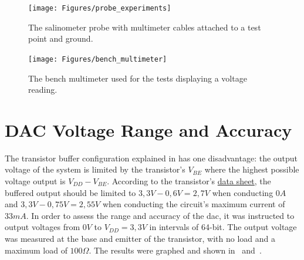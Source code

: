 \begin{figure}[ht]
    \begin{minipage}{0.5\textwidth}
        \centering
        \texttt{[image: Figures/probe\_experiments]}
        \caption{The salinometer probe with multimeter cables attached to a test point and ground.}
        \label{fig:probe-experiments} %
    \end{minipage}
    \begin{minipage}{0.5\textwidth}
        \centering
        \texttt{[image: Figures/bench\_multimeter]}
        \caption{The bench multimeter used for the tests displaying a voltage reading.}
        \label{fig:bench-multimeter} %
    \end{minipage}
\end{figure}

\section{DAC Voltage Range and Accuracy}\label{sec:dac-voltage-range-and-accuracy}

The transistor buffer configuration explained in  has one disadvantage: the output voltage of the system is limited by the transistor's $V_{BE}$ where the highest possible voltage output is $V_{DD} - V_{BE}$.
According to the transistor's \href{https://www.lcsc.com/datasheet/lcsc_datasheet_2310131500_Jiangsu-Changjing-Electronics-Technology-Co---Ltd--S8050-J3Y-RANGE-200-350_C2146.pdf}{data sheet}, the buffered output should be limited to $3,3V - 0,6V = 2,7V$ when conducting $0A$ and $3,3V - 0,75V = 2,55V$ when conducting the circuit's maximum current of $33mA$.
In order to assess the range and accuracy of the \gls{dac}, it was instructed to output voltages from $0V$ to $V_{DD} = 3,3V$ in intervals of 64-bit. 
The output voltage was measured at the base and emitter of the transistor, with no load and a maximum load of $100\Omega$.
The results were graphed and shown in~ and~.

